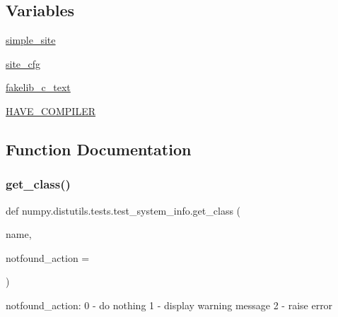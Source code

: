 \subsection*{Variables}
\begin{DoxyCompactItemize}
\item 
\hyperlink{namespacenumpy_1_1distutils_1_1tests_1_1test__system__info_a5dab735daffe04b174a24f7755599b5d}{simple\+\_\+site}
\item 
\hyperlink{namespacenumpy_1_1distutils_1_1tests_1_1test__system__info_a166ee205c00c57ab673de8d73e698398}{site\+\_\+cfg}
\item 
\hyperlink{namespacenumpy_1_1distutils_1_1tests_1_1test__system__info_abbcdccf15c315e6d44da30f636739ed3}{fakelib\+\_\+c\+\_\+text}
\item 
\hyperlink{namespacenumpy_1_1distutils_1_1tests_1_1test__system__info_a33cbcae873d57fcbc9eb58caea8e0aea}{H\+A\+V\+E\+\_\+\+C\+O\+M\+P\+I\+L\+ER}
\end{DoxyCompactItemize}


\subsection{Function Documentation}
\mbox{\label{namespacenumpy_1_1distutils_1_1tests_1_1test__system__info_a9678e9a6bdb1844d5f271e085614ffe4}} 
\subsubsection{\texorpdfstring{get\+\_\+class()}{get\_class()}}
{\footnotesize\ttfamily def numpy.\+distutils.\+tests.\+test\+\_\+system\+\_\+info.\+get\+\_\+class (\begin{DoxyParamCaption}\item[{}]{name,  }\item[{}]{notfound\+\_\+action = {} }\end{DoxyParamCaption})}

\begin{DoxyVerb}notfound_action:
  0 - do nothing
  1 - display warning message
  2 - raise error
\end{DoxyVerb}
 \mbox{\label{namespacenumpy_1_1distutils_1_1tests_1_1test__system__info_a47fa3dc3da4b31c9209197007c08d843}} 
